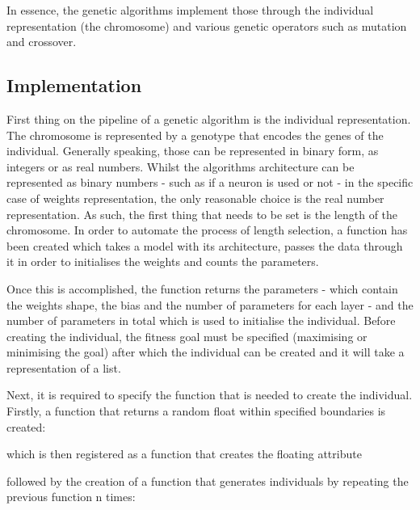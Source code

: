 \documentclass{report}
\begin{document}
In essence, the genetic algorithms implement those through the individual representation (the chromosome) and various genetic operators such as mutation and crossover. 

\subsection{Implementation}

First thing on the pipeline of a genetic algorithm is the individual representation. The chromosome is represented by a genotype that encodes the genes of the individual. Generally speaking, those can be represented in binary form, as integers or as real numbers. Whilst the algorithms architecture can be represented as binary numbers - such as if a neuron is used or not - in the specific case of weights representation, the only reasonable choice is the real number representation. As such, the first thing that needs to be set is the length of the chromosome. In order to automate the process of length selection, a function has been created which takes a model with its architecture, passes the data through it in order to initialises the weights and counts the parameters.



Once this is accomplished, the function returns the parameters - which contain the weights shape, the bias and the number of parameters for each layer - and the number of parameters in total which is used to initialise the individual. Before creating the individual, the fitness goal must be specified (maximising or minimising the goal) after which the individual can be created and it will take a representation of a list.



Next, it is required to specify the function that is needed to create the individual. Firstly, a function that returns a random float within specified boundaries is created:



which is then registered as a function that creates the floating attribute



followed by the creation of a function that generates individuals by repeating the previous function n times:

\end{document}

